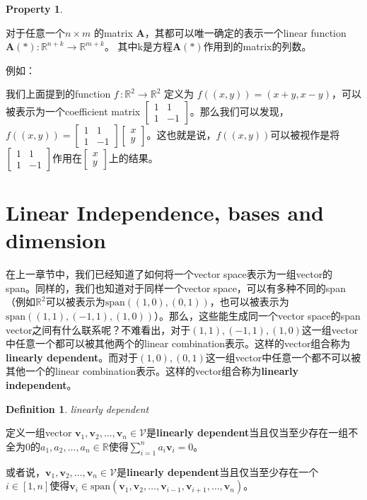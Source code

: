 \documentclass{report}
\def\ra{\rightarrow}
\def\R{\mathbb{R}}
\def\V{\mathcal{V}}
\def\v{\mathbf{v}}
\def\span{\text{span}}
\newtheorem{definition}{Definition}[chapter]
\newcommand{\deftitle}[1]{\begin{definition}  #1 \end{definition}}
\newtheorem{property}{Property}[chapter]
\newcommand{\proptitle}[1]{\begin{property}  #1 \end{property}}
\newcommand{\defb}[1]{\begin{tcolorbox} [colback=orange!20, colframe=orange!60, sharp corners, leftrule={3pt}, rightrule={0pt}, toprule={0pt}, bottomrule={0pt}, left={2pt}, right={2pt}, top={3pt}, bottom={3pt}] \deftitle{#1}}
\def\defe{\end{tcolorbox}}
\newcommand{\propb}[1]{\begin{tcolorbox} [colback=red!10, colframe=red!60, sharp corners, leftrule={3pt}, rightrule={0pt}, toprule={0pt}, bottomrule={0pt}, left={2pt}, right={2pt}, top={3pt}, bottom={3pt}]\proptitle{#1}}
\def\prope{\end{tcolorbox}}
\def\egb{\begin{tcolorbox} [colback=cyan!20, colframe=cyan!40, sharp corners, leftrule={5pt}, rightrule={0pt}, toprule={0pt}, bottomrule={0pt}, left={2pt}, right={2pt}, top={3pt}, bottom={3pt}]}
\def\ege{\end{tcolorbox}}
\begin{document}
\propb{}
	对于任意一个$ n \times m $ 的matrix \textbf{A}，其都可以唯一确定的表示一个linear function $\mathbf{A}(*) : \R^{n+k} \ra \R^{m+k}$。
	其中k是方程$\mathbf{A}(*)$作用到的matrix的列数。
\prope

\egb
例如：

我们上面提到的function $ f \, : \R^2 \ra \R^2 $ 定义为 $ f((x,y)) = (x+y,x-y) $，可以被表示为一个coefficient matrix $ \left[ \begin{matrix}
	1 & 1 \\
	1 & -1
\end{matrix}\right] $。那么我们可以发现，$ f((x,y)) = \left[ \begin{matrix}
	1 & 1 \\
	1 & -1
\end{matrix}\right] \left[ \begin{matrix}
	x \\
	y
\end{matrix}\right] $。这也就是说，$ f((x,y)) $可以被视作是将$ \left[ \begin{matrix}
	1 & 1 \\
	1 & -1
\end{matrix}\right] $作用在$ \left[ \begin{matrix}
	x \\
	y
\end{matrix}\right] $上的结果。
\ege

\section{Linear Independence, bases and dimension}

在上一章节中，我们已经知道了如何将一个vector space表示为一组vector的span。同样的，我们也知道对于同样一个vector space，可以有多种不同的span（例如$\R^2$可以被表示为$\span((1,0),(0,1))$，也可以被表示为$\span((1,1),(-1,1),(1,0))$）。那么，这些能生成同一个vector space的span vector之间有什么联系呢？不难看出，对于$(1,1),(-1,1),(1,0)$这一组vector中任意一个都可以被其他两个的linear combination表示。这样的vector组合称为\textbf{linearly dependent}。而对于$(1,0),(0,1)$这一组vector中任意一个都不可以被其他一个的linear combination表示。这样的vector组合称为\textbf{linearly independent}。

\defb{linearly dependent}
	定义一组vector $\v_1,\v_2,\dots,\v_n \in \V$是\textbf{linearly dependent}当且仅当至少存在一组不全为0的$a_1,a_2,\dots,a_n \in \R$使得$\sum_{i=1}^{n} a_i \v_i = 0$。

	或者说，$\v_1,\v_2,\dots,\v_n \in \V$是\textbf{linearly dependent}当且仅当至少存在一个$i \in [1,n]$使得$\v_i \in \span(\v_1,\v_2,\dots,\v_{i-1},\v_{i+1},\dots,\v_n)$。
\defe
\end{document}
